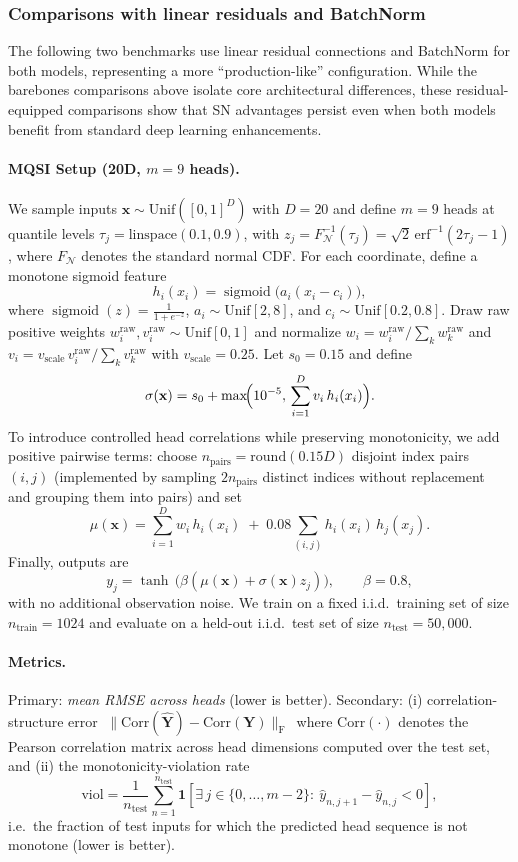 \documentclass{article}
\theoremstyle{plain}
\theoremstyle{definition}
\theoremstyle{remark}
\begin{document}
\subsubsection{Comparisons with linear residuals and BatchNorm}\label{sssec:residual-equipped}

The following two benchmarks use linear residual connections and BatchNorm for both models, representing a more ``production-like'' configuration. While the barebones comparisons above isolate core architectural differences, these residual-equipped comparisons show that SN advantages persist even when both models benefit from standard deep learning enhancements.

\paragraph{MQSI Setup (20D, $m{=}9$ heads).}
We sample inputs $\mathbf{x}\sim \mathrm{Unif}([0,1]^D)$ with $D=20$ and define $m=9$ heads at quantile levels
$\tau_j=\mathrm{linspace}(0.1,0.9)$, with $z_j=F_{\mathcal{N}}^{-1}(\tau_j)=\sqrt{2}\,\mathrm{erf}^{-1}(2\tau_j-1)$, where $F_{\mathcal{N}}$ denotes the standard normal CDF.
For each coordinate, define a monotone sigmoid feature
$$h_i(x_i)=\operatorname{sigmoid}\!\bigl(a_i(x_i-c_i)\bigr),$$
where $\operatorname{sigmoid}(z)=\frac{1}{1+e^{-z}}$, $a_i\sim \mathrm{Unif}[2,8]$, and $c_i\sim \mathrm{Unif}[0.2,0.8]$.
Draw raw positive weights $w_i^{\mathrm{raw}},v_i^{\mathrm{raw}}\sim \mathrm{Unif}[0,1]$ and normalize
$w_i=w_i^{\mathrm{raw}}/\sum_k w_k^{\mathrm{raw}}$ and
$v_i=v_{\mathrm{scale}}\,v_i^{\mathrm{raw}}/\sum_k v_k^{\mathrm{raw}}$ with $v_{\mathrm{scale}}=0.25$.
Let $s_0=0.15$ and define
$$\sigma(\mathbf{x})=s_0+\max\!\Bigl(10^{-5},\,\sum_{i=1}^{D} v_i\,h_i(x_i)\Bigr).$$
To introduce controlled head correlations while preserving monotonicity, we add positive pairwise terms:
choose $n_{\mathrm{pairs}}=\mathrm{round}(0.15D)$ disjoint index pairs $(i,j)$ (implemented by sampling $2n_{\mathrm{pairs}}$ distinct indices without replacement and grouping them into pairs) and set
$$\mu(\mathbf{x})=\sum_{i=1}^{D} w_i\,h_i(x_i)\;+\;0.08\sum_{(i,j)} h_i(x_i)\,h_j(x_j).$$
Finally, outputs are
$$y_j=\tanh\,\!\bigl(\beta(\mu(\mathbf{x})+\sigma(\mathbf{x})z_j)\bigr),\qquad \beta=0.8,$$
with no additional observation noise. We train on a fixed i.i.d.\ training set of size $n_{\mathrm{train}}=1024$ and evaluate on a held-out i.i.d.\ test set of size $n_{\mathrm{test}}=50{,}000$.

\paragraph{Metrics.}
Primary: \emph{mean RMSE across heads} (lower is better). Secondary: (i) correlation-structure error
$\;\|\mathrm{Corr}(\widehat{\mathbf{Y}})-\mathrm{Corr}(\mathbf{Y})\|_{\mathrm{F}}\,$
where $\mathrm{Corr}(\cdot)$ denotes the Pearson correlation matrix across head dimensions computed over the test set, and (ii) the monotonicity-violation rate
$$\mathrm{viol}=\frac{1}{n_{\mathrm{test}}}\sum_{n=1}^{n_{\mathrm{test}}}\mathbf{1}\!\left[\exists\, j\in\{0,\dots,m-2\}:\ \widehat{y}_{n,j+1}-\widehat{y}_{n,j}<0\right],$$
i.e.\ the fraction of test inputs for which the predicted head sequence is not monotone (lower is better).
\end{document}
